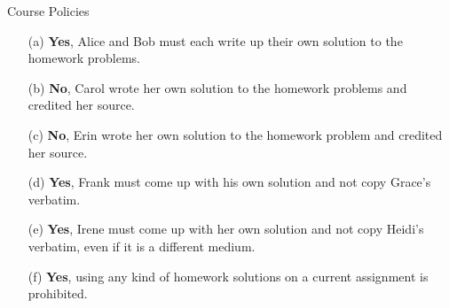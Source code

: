 \begin{homeworkProblem}{Course Policies}
    \begin{itemize}
        \item[(a)] \textbf{Yes}, Alice and Bob must each write up their own 
        solution to the homework problems.
        \item[(b)] \textbf{No}, Carol wrote her own solution to the 
        homework problems and credited her source.
        \item[(c)] \textbf{No}, Erin wrote her own solution to the homework 
        problem and credited her source.
        \item[(d)] \textbf{Yes}, Frank must come up with his own solution 
        and not copy Grace's verbatim. 
        \item[(e)] \textbf{Yes}, Irene must come up with her own solution 
        and not copy Heidi's verbatim, even if it is a different medium.
        \item[(f)] \textbf{Yes}, using any kind of homework solutions on a current assignment is prohibited. 
    \end{itemize}
    
\end{homeworkProblem}